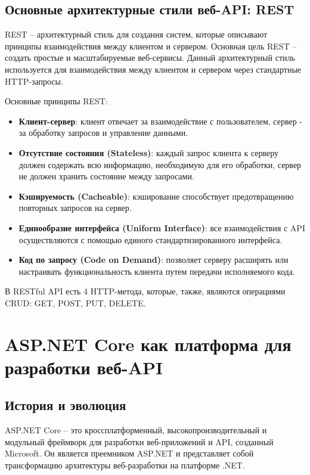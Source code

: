 \documentclass[a4paper,12pt]{report}
\begin{document}
\subsection{Основные архитектурные стили веб-\acs{API}: \acs{REST}}

\ac{REST} -- архитектурный стиль для создания систем, которые описывают принципы 
взаимодействия между клиентом и сервером. Основная цель \acs{REST} -- создать простые и масштабируемые веб-сервисы. 
Данный архитектурный стиль используется для взаимодействия между клиентом и сервером через стандартные \acs{HTTP}-запросы.

Основные принципы \acs{REST}:
\begin{itemize}
    \item
        \textbf{Клиент-сервер}: клиент отвечает за взаимодействие с пользователем, сервер - за обработку запросов и управление данными.
    \item 
        \textbf{Отсутствие состояния (Stateless)}: каждый запрос клиента к серверу должен содержать всю информацию, необходимую для его обработки, 
        сервер не должен хранить состояние между запросами.
    \item
        \textbf{Кэшируемость (Cacheable)}: кэширование способствует предотвращению повторных запросов на сервер.
    \item
        \textbf{Единообразие интерфейса (Uniform Interface)}: все взаимодействия с API осуществляются с помощью единого стандартизированного интерфейса.
    \item
        \textbf{Код по запросу (Code on Demand)}: позволяет серверу расширять или настраивать функциональность клиента путем передачи исполняемого кода.
\end{itemize}

В \acs{REST}ful \acs{API} есть 4 \acs{HTTP}-метода, которые, также, являются операциями \acs{CRUD}: GET, POST, PUT, DELETE.

\section{ASP.NET Core как платформа для разработки веб-\acs{API}}

\subsection{История и эволюция}
ASP.NET Core -- это кроссплатформенный, высокопроизводительный и модульный фреймворк для разработки веб-приложений и \acs{API}, созданный Microsoft. 
Он является преемником ASP.NET и представляет собой трансформацию архитектуры веб-разработки на платформе .NET.
\end{document}
